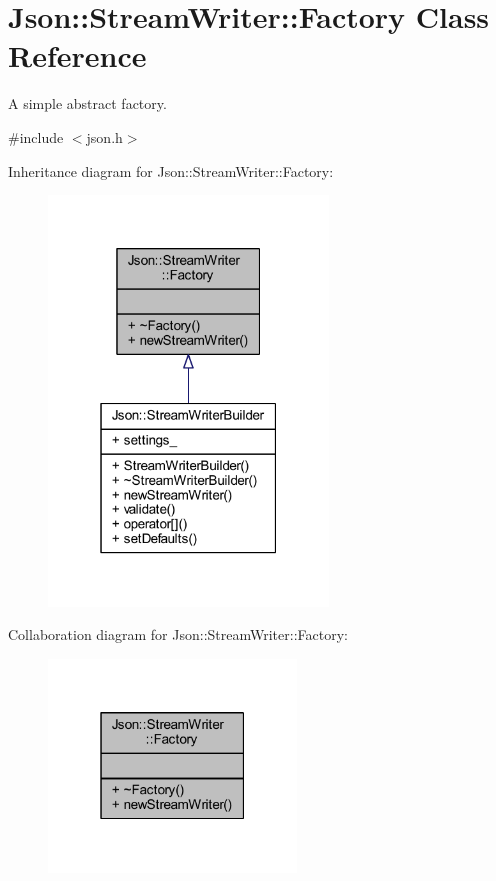 \hypertarget{class_json_1_1_stream_writer_1_1_factory}{}\section{Json\+:\+:Stream\+Writer\+:\+:Factory Class Reference}
\label{class_json_1_1_stream_writer_1_1_factory}


A simple abstract factory.  




{\ttfamily \#include $<$json.\+h$>$}



Inheritance diagram for Json\+:\+:Stream\+Writer\+:\+:Factory\+:\nopagebreak
\begin{figure}[H]
\begin{center}
\leavevmode
\includegraphics[width=211pt]{class_json_1_1_stream_writer_1_1_factory__inherit__graph}
\end{center}
\end{figure}


Collaboration diagram for Json\+:\+:Stream\+Writer\+:\+:Factory\+:\nopagebreak
\begin{figure}[H]
\begin{center}
\leavevmode
\includegraphics[width=187pt]{class_json_1_1_stream_writer_1_1_factory__coll__graph}
\end{center}
\end{figure}
